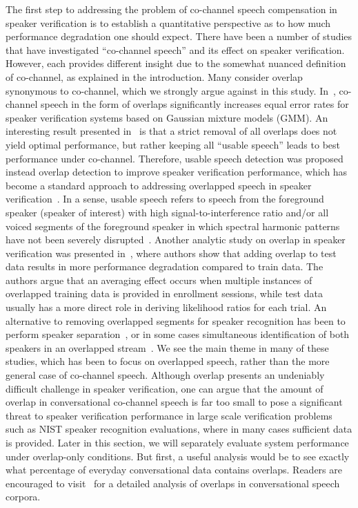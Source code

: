 \documentclass[journal]{IEEEtran}
\begin{document}
The first step to addressing the problem of co-channel speech compensation in speaker verification is to establish a quantitative perspective as to how much performance degradation one should expect. 
There have been a number of studies that have investigated ``co-channel speech'' and its effect on speaker verification. 
However, each provides different insight due to the somewhat nuanced definition of co-channel, as explained in the introduction. 
Many consider overlap synonymous to co-channel, which we strongly argue against in this study. 
In~\cite{yantorno_report}, co-channel speech in the form of overlaps significantly increases equal error rates for speaker verification systems based on Gaussian mixture models (GMM). 
An interesting result presented in~\cite{yantorno_report} is that a strict removal of all overlaps does not yield optimal performance, but rather keeping all ``usable speech'' leads to best performance under co-channel.  
Therefore, usable speech detection was proposed instead overlap detection to improve speaker verification performance, which has become a standard approach to addressing overlapped speech in speaker verification~\cite{Dwang_03, Dwang_03_trans}. 
In a sense, usable speech refers to speech from the foreground speaker (speaker of interest) with high signal-to-interference ratio and/or all voiced segments of the foreground speaker in which spectral harmonic patterns have not been severely disrupted~\cite{smolenski_tut}. 
Another analytic study on overlap in speaker verification was presented in~\cite{navid_pyknogram_jp}, where authors show that adding overlap to test data results in more performance degradation compared to train data. 
The authors argue that an averaging effect occurs when multiple instances of overlapped training data is provided in enrollment sessions, while test data usually has a more direct role in deriving likelihood ratios for each trial. 
An alternative to removing overlapped segments for speaker recognition has been to perform speaker separation~\cite{saeidi2010signal, mowlaee2010joint}, or in some cases simultaneous identification of both speakers in an overlapped stream~\cite{zhao2015cochannel, sadjadi_heck_icassp14}. 
We see the main theme in many of these studies, which has been to focus on overlapped speech, rather than the more general case of co-channel speech. 
Although overlap presents an undeniably difficult challenge in speaker verification, one can argue that the amount of overlap in conversational co-channel speech is far too small to pose a significant threat to speaker verification performance in large scale verification problems such as NIST speaker recognition evaluations, where in many cases sufficient data is provided. 
Later in this section, we will separately evaluate system performance under overlap-only conditions. But first, a useful analysis would be to see exactly what percentage of everyday conversational data contains overlaps. 
Readers are encouraged to visit~\cite{shriberg_01} for a detailed analysis of overlaps in conversational speech corpora. 
\end{document}

